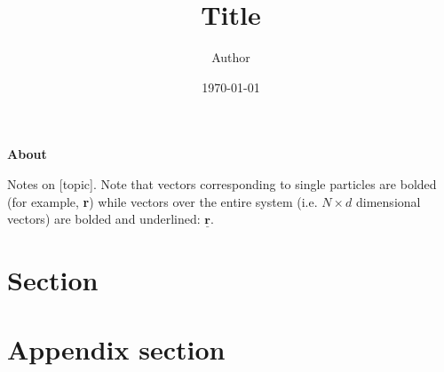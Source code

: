 \documentclass[11pt]{article}
\title{\headerfont\color{darkblue}\Huge \textbf{Title}}
\author{Author}
\date{\headerfont\today}
\newcommand{\headerfont}{\fontfamily{ppl}\selectfont}
\renewcommand{\vec}[1]{\underaccent{\widetilde}{#1}}
\renewcommand{\vec}[1]{\underline{\textbf{#1}}}
\begin{document}
\maketitle
\thispagestyle{empty} 
\vfill 

\begin{tcolorbox}[
    colback=gray!10,  
    colframe=gray!10, 
    boxrule=0pt,     
    sharp corners,    
    left=15pt, right=15pt, top=15pt, bottom=15pt 
]
{\headerfont\color{darkblue}\large\textbf{About}}\par\vspace{0.5em}
Notes on [topic].
Note that vectors corresponding to single particles are bolded (for example, \textbf{r}) while vectors over the entire system (i.e. $N\times d$ dimensional vectors) are bolded and underlined: $\vec{r}$.
\end{tcolorbox}
\newpage

\tableofcontents
\thispagestyle{empty}

\newpage
\setcounter{page}{1} 

\section{Section}










\appendix
\section{Appendix section}
\end{document}
